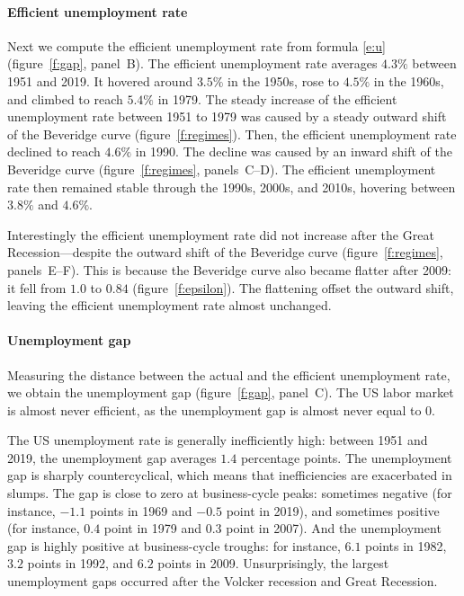 \documentclass[letterpaper,12pt,leqno]{article}
\begin{document}
\paragraph{Efficient unemployment rate} Next we compute the efficient unemployment rate from formula \eqref{e:u} (figure~\ref{f:gap}, panel~B). The efficient unemployment rate averages $4.3\%$ between 1951 and 2019. It hovered around $3.5\%$ in the 1950s, rose to $4.5\%$ in the 1960s, and climbed to reach $5.4\%$ in 1979. The steady increase of the efficient unemployment rate between 1951 to 1979 was caused by a steady outward shift of the Beveridge curve (figure~\ref{f:regimes}). Then, the efficient unemployment rate declined to reach $4.6\%$ in 1990. The decline was caused by an inward shift of the Beveridge curve (figure~\ref{f:regimes}, panels~C--D). The efficient unemployment rate then remained stable through the 1990s, 2000s, and 2010s, hovering between $3.8\%$ and $4.6\%$. 

Interestingly the efficient unemployment rate did not increase after the Great Recession---despite the outward shift of the Beveridge curve (figure~\ref{f:regimes}, panels~E--F). This is because the Beveridge curve also became flatter after 2009: it fell from $1.0$ to $0.84$ (figure~\ref{f:epsilon}). The flattening offset the outward shift, leaving the efficient unemployment rate almost unchanged.

\paragraph{Unemployment gap} Measuring the distance between the actual and the efficient unemployment rate, we obtain the unemployment gap (figure~\ref{f:gap}, panel~C). 
The US labor market is almost never efficient, as the unemployment gap is almost never equal to $0$.

The US unemployment rate is generally inefficiently high: between 1951 and 2019, the unemployment gap averages $1.4$ percentage points. The unemployment gap is sharply countercyclical, which means that inefficiencies are exacerbated in slumps. The gap is close to zero at business-cycle peaks: sometimes negative (for instance, $-1.1$ points in 1969 and $-0.5$ point in 2019), and sometimes positive (for instance, $0.4$ point in 1979 and $0.3$ point in 2007). And the unemployment gap is highly positive at business-cycle troughs: for instance, $6.1$ points in 1982, $3.2$ points in 1992, and $6.2$ points in 2009. Unsurprisingly, the largest unemployment gaps occurred after the Volcker recession and Great Recession.
\end{document}
